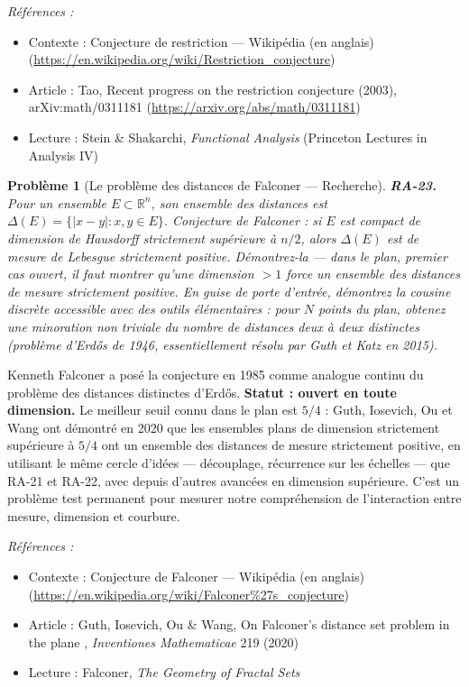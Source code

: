 \documentclass[11pt]{article}
\newtheorem{problem}{Problème}
\newenvironment{refs}{\par\small\noindent\emph{Références :}\begin{itemize}\setlength\itemsep{0pt}}{\end{itemize}\normalsize}
\begin{document}
\begin{refs}
\item Contexte : Conjecture de restriction --- Wikipédia (en anglais) (\url{https://en.wikipedia.org/wiki/Restriction_conjecture})
\item Article : Tao, \og{} Recent progress on the restriction conjecture \fg{} (2003), arXiv:math/0311181 (\url{https://arxiv.org/abs/math/0311181})
\item Lecture : Stein \& Shakarchi, \textit{Functional Analysis} (Princeton Lectures in Analysis IV)
\end{refs}

\bigskip

\begin{problem}[{Le problème des distances de Falconer --- Recherche}]
\textbf{RA-23.} Pour un ensemble $ E \subset \mathbb{R}^n $, son ensemble
des distances est $ \Delta(E) = \{ |x - y| : x, y \in E \} $. Conjecture de Falconer : si $ E $
est compact de dimension de Hausdorff strictement supérieure à $ n/2 $, alors $ \Delta(E) $ est
de mesure de Lebesgue strictement positive. Démontrez-la --- dans le plan, premier cas ouvert, il faut
montrer qu'une dimension $ > 1 $ force un ensemble des distances de mesure strictement
positive. En guise de porte d'entrée, démontrez la cousine discrète accessible avec des outils
élémentaires : pour $ N $ points du plan, obtenez une minoration non triviale du nombre de
distances deux à deux distinctes (problème d'Erd\H{o}s de 1946, essentiellement résolu par Guth et Katz
en 2015).
\end{problem}

\noindent Kenneth Falconer a posé la conjecture en 1985 comme analogue continu du problème
des distances distinctes d'Erd\H{o}s. \textbf{Statut : ouvert en toute dimension.} Le meilleur seuil connu
dans le plan est $ 5/4 $ : Guth, Iosevich, Ou et Wang ont démontré en 2020 que les ensembles plans
de dimension strictement supérieure à $ 5/4 $ ont un ensemble des distances de mesure strictement
positive, en utilisant le même cercle d'idées --- découplage, récurrence sur les échelles --- que RA-21
et RA-22, avec depuis d'autres avancées en dimension supérieure. C'est un problème test permanent
pour mesurer notre compréhension de l'interaction entre mesure, dimension et courbure.

\begin{refs}
\item Contexte : Conjecture de Falconer --- Wikipédia (en anglais) (\url{https://en.wikipedia.org/wiki/Falconer%27s_conjecture})
\item Article : Guth, Iosevich, Ou \& Wang, \og{} On Falconer's distance set problem in the plane \fg{}, \textit{Inventiones Mathematicae} 219 (2020)
\item Lecture : Falconer, \textit{The Geometry of Fractal Sets}
\end{refs}
\end{document}
